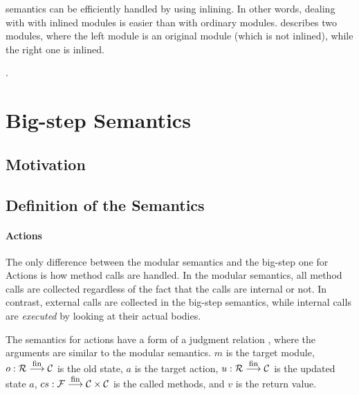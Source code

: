 \Step{} semantics can be efficiently handled by using inlining. In
other words, dealing with \Step{} with inlined modules is easier than
with ordinary modules.  describes two
modules, where the left module is an original module (which is not
inlined), while the right one is inlined.

.

\section{Big-step Semantics}

\subsection{Motivation}

\subsection{Definition of the Semantics}

\paragraph{Actions}

The only difference between the modular semantics and the big-step one
for Actions is how method calls are handled. In the modular semantics,
all method calls are collected regardless of the fact that the calls
are internal or not. In contrast, external calls are collected in the
big-step semantics, while internal calls are \emph{executed} by
looking at their actual bodies.

The semantics for actions have a form of a judgment relation
, where the arguments are similar to the
modular semantics. $m$ is the target module, $o : \mathcal{R} \stackrel{\textrm{\footnotesize{fin}}}{\longrightarrow} \mathcal{C}{}$ is the
old state, $a$ is the target action, $u : \mathcal{R} \stackrel{\textrm{\footnotesize{fin}}}{\longrightarrow} \mathcal{C}{}$ is the updated
state $a$, $cs : \mathcal{F} \stackrel{\textrm{\footnotesize{fin}}}{\longrightarrow} \mathcal{C} \times \mathcal{C}{}$ is the called methods, and $v$ is the
return value.

